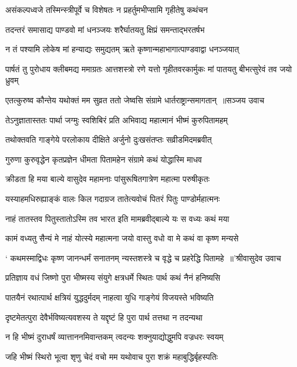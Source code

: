 \twolineshloka
{असंकल्पध्वजे तस्मिन्स्त्रीपूर्वे च विशेषतः}
{न प्रहर्तुमभीप्सामि गृहीतेषु कथंचन}


\twolineshloka
{तदन्तरं समासाद्य पाण्डवो मां धनञ्जयः}
{शरैर्घातयतु क्षिप्रं समन्ताद्भरतर्षभ}


\twolineshloka
{न तं पश्यामि लोकेष मां हन्याद्यः समुद्यतम्}
{ऋते कृष्णान्महाभागात्पाण्डवाद्वा धनञ्जयात्}


\threelineshloka
{पार्षतं तु पुरोधाय क्लीबमद्य ममाग्रतः}
{आत्तशस्त्रो रणे यत्तो गृहीतवरकार्मुकः}
{मां पातयतु बीभत्सुरेवं तव जयो ध्रुवम्}


\threelineshloka
{एतत्कुरुष्व कौन्तेय यथोक्तं मम सुव्रत}
{ततो जेष्वसि संग्रामे धार्तराष्ट्रान्समागतान् ॥सञ्जय उवाच}
{}


\twolineshloka
{तेऽनुज्ञातास्ततः पार्था जग्मुः स्वशिबिरं प्रति}
{अभिवाद्य महात्मानं भीष्मं कुरुपितामहम्}


\twolineshloka
{तथोक्तवति गाङ्गेये परलोकाय दीक्षिते}
{अर्जुनो दुःखसंतप्तः सव्रीडमिदमब्रवीत्}


\twolineshloka
{गुरुणा कुरुवृद्धेन कृतप्रज्ञेन धीमता}
{पितामहेन संग्रामे कथं योद्धास्मि माधव}


\twolineshloka
{क्रीडता हि मया बाल्ये वासुदेव महामनाः}
{पांसुरूषितगात्रेण महात्मा परुषीकृतः}


\twolineshloka
{यस्याहमधिरुह्याङ्कं वालः किल गदाग्रज}
{तातेत्यवोचं पितरं पितुः पाण्डोर्महात्मनः}


\twolineshloka
{नाहं तातस्तव पितुस्तातोऽस्मि तव भारत}
{इति मामब्रवीद्बाल्ये यः स वध्यः कथं मया}


\twolineshloka
{कामं वध्यतु सैन्यं मे नाहं योत्स्ये महात्मना}
{जयो वास्तु वधो वा मे कथं वा कृष्ण मन्यसे}


\threelineshloka
{` कथमस्माद्विधः कृष्ण जानन्धर्मं सनातनम्}
{न्यस्तशस्त्रे च वृद्धे च प्रहरेद्धि पितामहे ॥'श्रीवासुदेव उवाच}
{}


\twolineshloka
{प्रतिज्ञाय वधं जिष्णो पुरा भीष्मस्य संयुगे}
{क्षत्रधर्मे स्थितः पार्थ कथं नैनं हनिष्यसि}


\twolineshloka
{पातयैनं रथात्पार्थ क्षत्रियं युद्धदुर्मदम्}
{नाहत्वा युधि गाङ्गेयं विजयस्ते भविष्यति}


\twolineshloka
{दृष्टमेतत्पुरा देवैर्भविष्यत्यवशस्य ते}
{यद्दृष्टं हि पुरा पार्थ तत्तथा न तदन्यथा}


\twolineshloka
{न हि भीष्मं दुराधर्षं व्यात्ताननमिवान्तकम्}
{त्वदन्यः शक्नुयाद्योद्धुमपि वज्रधरः स्वयम्}


\twolineshloka
{जहि भीष्मं स्थिरो भूत्वा शृणु चेदं वचो मम}
{यथोवाच पुरा शक्रं महाबुद्धिर्बृहस्पतिः}


